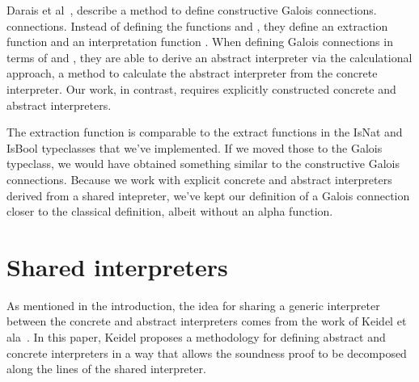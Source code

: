 Darais et al~\cite{darais2019constructive}, describe a method to define
constructive Galois connections.
connections. Instead of defining the functions  
and , they define an extraction function 
 and
an interpretation function . 
When defining Galois connections in terms of  and , they
are able to derive an abstract interpreter via the calculational approach, a
method to calculate the abstract interpreter from the concrete interpreter.
Our work, in contrast, requires explicitly constructed concrete and abstract
interpreters.

The extraction function is comparable to the extract functions in the
IsNat and IsBool typeclasses that we've implemented. If we moved those to the
Galois typeclass, we would have obtained something similar to the constructive
Galois connections. Because we work with explicit concrete and abstract
interpreters derived from a shared intepreter, we've kept our definition of a
Galois connection closer to the classical definition, albeit without an alpha
function.


\section{Shared interpreters}
As mentioned in the introduction, the idea for sharing a generic interpreter
between the concrete and abstract interpreters comes from the work of Keidel et
ala~\cite{keidel2020compositional}. In this paper, Keidel proposes a
methodology for defining abstract and concrete interpreters in a way that
allows the soundness proof to be decomposed along the lines of the shared
interpreter.


